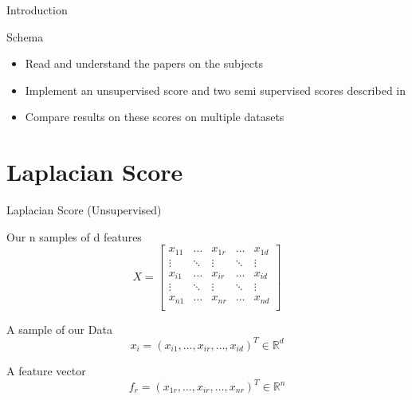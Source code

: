 \documentclass{beamer}
\begin{document}
\begin{frame}{Introduction}
    \begin{block}{Schema}
        \begin{itemize}
            \item Read and understand the papers on the subjects
            \item Implement an unsupervised score and two semi supervised scores described in \cite{kalakechConstraintScoresSemisupervised2011}
            \item Compare results on these scores on multiple datasets
        \end{itemize}
    \end{block}

\end{frame}

\section{Laplacian Score}
\begin{frame}{Laplacian Score (Unsupervised)}
    \begin{block}{Our n samples of d features}
     \[ X =
        \begin{bmatrix}
        x_{11} & \dots & x_{1r} & \dots & x_{1d} \\
        \vdots & \ddots & \vdots & \ddots & \vdots \\
        x_{i1} & \dots & x_{ir} & \dots & x_{id} \\
        \vdots & \ddots & \vdots & \ddots & \vdots \\
        x_{n1} & \dots & x_{nr} & \dots & x_{nd} \\
        \end{bmatrix}
        \]
    \end{block}

    \begin{block}{A sample of our Data}
        \[ x_i = (x_{i1}, \dots, x_{ir}, \dots, x_{id})^T \in \mathbb{R}^d \]
    \end{block}

    \begin{block}{A feature vector}
        \[ f_{r} = (x_{1r}, \dots, x_{ir}, \dots, x_{nr})^T \in \mathbb{R}^n \]
    \end{block}
\end{frame}
\end{document}

